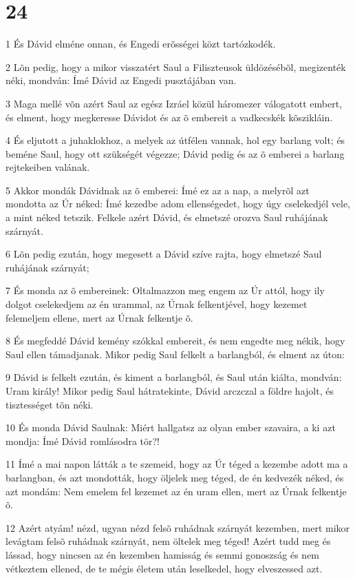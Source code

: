 \chapter{24}

\par 1 És Dávid elméne onnan, és Engedi erõsségei közt tartózkodék.
\par 2 Lõn pedig, hogy a mikor visszatért Saul a Filiszteusok üldözésébõl, megizenték néki, mondván: Ímé Dávid az Engedi pusztájában van.
\par 3 Maga mellé võn azért Saul az egész Izráel közül háromezer válogatott embert, és elment, hogy megkeresse Dávidot és az õ embereit a vadkecskék kõszikláin.
\par 4 És eljutott a juhaklokhoz, a melyek az útfélen vannak, hol egy barlang volt; és beméne Saul, hogy ott szükségét végezze; Dávid pedig és az õ emberei a barlang rejtekeiben valának.
\par 5 Akkor mondák Dávidnak az õ emberei: Ímé ez az a nap, a melyrõl azt mondotta az Úr néked: Ímé kezedbe adom ellenségedet, hogy úgy cselekedjél vele, a mint néked tetszik. Felkele azért Dávid, és elmetszé orozva Saul ruhájának szárnyát.
\par 6 Lõn pedig ezután, hogy megesett a Dávid szíve rajta, hogy elmetszé Saul ruhájának szárnyát;
\par 7 És monda az õ embereinek: Oltalmazzon meg engem az Úr attól, hogy ily dolgot cselekedjem az én urammal, az Úrnak felkentjével, hogy kezemet felemeljem ellene, mert az Úrnak felkentje õ.
\par 8 És megfeddé Dávid kemény szókkal embereit, és nem engedte meg nékik, hogy Saul ellen támadjanak. Mikor pedig Saul felkelt a barlangból, és elment az úton:
\par 9 Dávid is felkelt ezután, és kiment a barlangból, és Saul után kiálta, mondván: Uram király! Mikor pedig Saul hátratekinte, Dávid arczczal a földre hajolt, és tisztességet tõn néki.
\par 10 És monda Dávid Saulnak: Miért hallgatsz az olyan ember szavaira, a ki azt mondja: Ímé Dávid romlásodra tör?!
\par 11 Ímé a mai napon látták a te szemeid, hogy az Úr téged a kezembe adott ma a barlangban, és azt mondották, hogy öljelek meg téged, de én kedvezék néked, és azt mondám: Nem emelem fel kezemet az én uram ellen, mert az Úrnak felkentje õ.
\par 12 Azért atyám! nézd, ugyan nézd felsõ ruhádnak szárnyát kezemben, mert mikor levágtam felsõ ruhádnak szárnyát, nem öltelek meg téged! Azért tudd meg és lássad, hogy nincsen az én kezemben hamisság és semmi gonoszság és nem vétkeztem ellened, de te mégis életem után leselkedel, hogy elveszessed azt.
